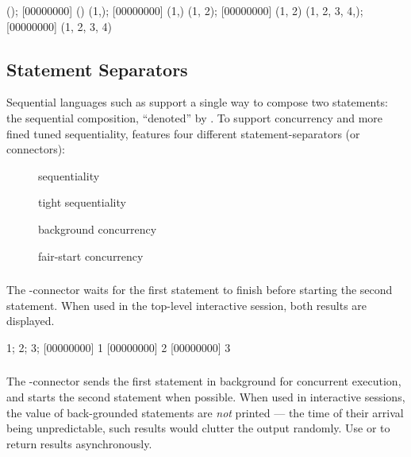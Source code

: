 \begin{urbiscript}
();
[00000000] ()
(1,);
[00000000] (1,)
(1, 2);
[00000000] (1, 2)
(1, 2, 3, 4,);
[00000000] (1, 2, 3, 4)
\end{urbiscript}



\subsection{Statement Separators}
\label{sec:lang:separators}

Sequential languages such as \Cxx support a single way to compose two
statements: the sequential composition, ``denoted'' by \samp{;}.  To
support concurrency and more fined tuned sequentiality, \us features
four different statement-separators (or connectors):
\begin{description}
\item[\samp{;}] sequentiality
\item[\samp{|}] tight sequentiality
\item[\samp{,}] background concurrency
\item[\samp{\&}] fair-start concurrency
\end{description}

\subsubsection{\samp{;}}

The \samp{;}-connector waits for the first statement to finish before
starting the second statement.  When used in the top-level interactive
session, both results are displayed.

\begin{urbiscript}
1; 2; 3;
[00000000] 1
[00000000] 2
[00000000] 3
\end{urbiscript}

\subsubsection{\samp{,}}

The \samp{,}-connector sends the first statement in background for
concurrent execution, and starts the second statement when possible.
When used in interactive sessions, the value of back-grounded
statements are \emph{not} printed --- the time of their arrival being
unpredictable, such results would clutter the output randomly.  Use
 or  to return results
asynchronously.

